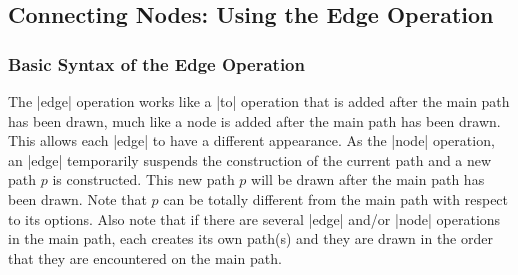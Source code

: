 \subsection{Connecting Nodes: Using the Edge Operation}

\label{section-nodes-edges}

\subsubsection{Basic Syntax of the Edge Operation}

The |edge| operation works like a |to| operation that is added after
the main path has been drawn, much like a node is added after the main
path has been drawn. This allows each |edge| to have a
different appearance. As the |node| operation, an |edge| temporarily
suspends the construction of the current path and a new path $p$ is
constructed. This new path $p$ will be drawn after the main path has
been drawn. Note that $p$ can be totally different from the main
path with respect to its options. Also note that if there are
several |edge| and/or |node| operations in the main path, each
creates its own path(s) and they are drawn in the order that they
are encountered on the main path.

